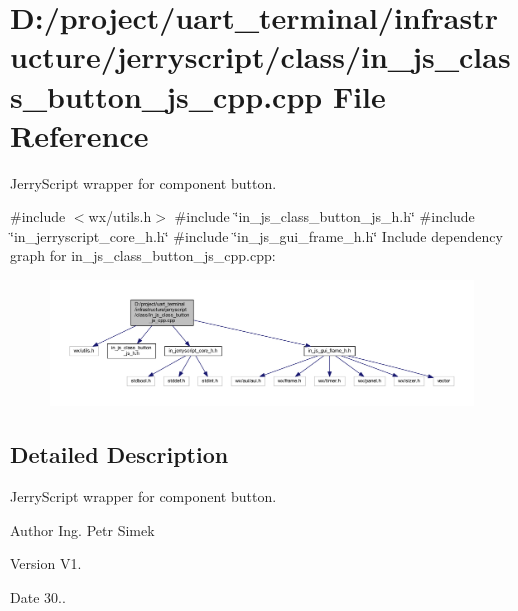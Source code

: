 \section{D\+:/project/uart\+\_\+terminal/infrastructure/jerryscript/class/in\+\_\+js\+\_\+class\+\_\+button\+\_\+js\+\_\+cpp.cpp File Reference}
\label{in__js__class__button__js__cpp_8cpp}


Jerry\+Script wrapper for component button.  


{\ttfamily \#include $<$wx/utils.\+h$>$}\newline
{\ttfamily \#include \char`\"{}in\+\_\+js\+\_\+class\+\_\+button\+\_\+js\+\_\+h.\+h\char`\"{}}\newline
{\ttfamily \#include \char`\"{}in\+\_\+jerryscript\+\_\+core\+\_\+h.\+h\char`\"{}}\newline
{\ttfamily \#include \char`\"{}in\+\_\+js\+\_\+gui\+\_\+frame\+\_\+h.\+h\char`\"{}}\newline
Include dependency graph for in\+\_\+js\+\_\+class\+\_\+button\+\_\+js\+\_\+cpp.\+cpp\+:
\nopagebreak
\begin{figure}[H]
\begin{center}
\leavevmode
\includegraphics[width=350pt]{in__js__class__button__js__cpp_8cpp__incl}
\end{center}
\end{figure}


\subsection{Detailed Description}
Jerry\+Script wrapper for component button. 

\begin{DoxyAuthor}{Author}
Ing. Petr Simek 
\end{DoxyAuthor}
\begin{DoxyVersion}{Version}
V1. 
\end{DoxyVersion}
\begin{DoxyDate}{Date}
30.. 
\end{DoxyDate}
